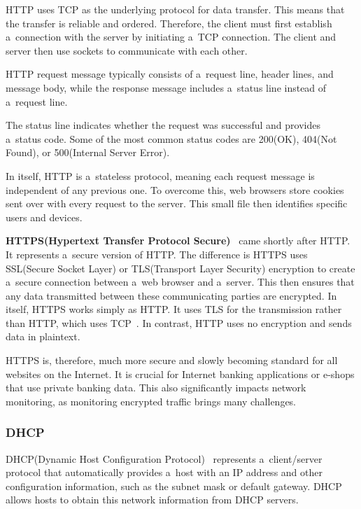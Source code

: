 \documentclass[
  printed,     %
  color,       %
  oneside,     %
  nosansbold,  %
  nocolorbold, %
  nolof,         %
  nolot,         %
]{fithesis4}
\begin{document}
HTTP uses TCP as the underlying protocol for data transfer. This means that the transfer is reliable and ordered. Therefore, the client must first establish a~connection with the server by initiating a~TCP connection. The client and server then use sockets to communicate with each other.

HTTP request message typically consists of a~request line, header lines, and message body, while the response message includes a~status line instead of a~request line.

The status line indicates whether the request was successful and provides a~status code. Some of the most common status codes are 200(OK), 404(Not Found), or 500(Internal Server Error).

In itself, HTTP is a~stateless protocol, meaning each request message is independent of any previous one. To overcome this, web browsers store cookies sent over with every request to the server. This small file then identifies specific users and devices.

\medskip

\textbf{HTTPS(Hypertext Transfer Protocol Secure)}~\cite{10.5555/2584507} came shortly after HTTP. It represents a~secure version of HTTP. The difference is HTTPS uses SSL(Secure Socket Layer) or TLS(Transport Layer Security) encryption to create a~secure connection between a~web browser and a~server. This then ensures that any data transmitted between these communicating parties are encrypted. In itself, HTTPS works simply as HTTP. It uses TLS for the transmission rather than HTTP, which uses TCP~\cite{RFC2818}. In contrast, HTTP uses no encryption and sends data in plaintext.

HTTPS is, therefore, much more secure and slowly becoming standard for all websites on the Internet. It is crucial for Internet banking applications or e-shops that use private banking data. This also significantly impacts network monitoring, as monitoring encrypted traffic brings many challenges.

\subsubsection{DHCP}

DHCP(Dynamic Host Configuration Protocol)~\cite{RFC2131} represents a~client/server protocol that automatically provides a~host with an IP address and other configuration information, such as the subnet mask or default gateway. DHCP allows hosts to obtain this network information from DHCP servers.
\end{document}
